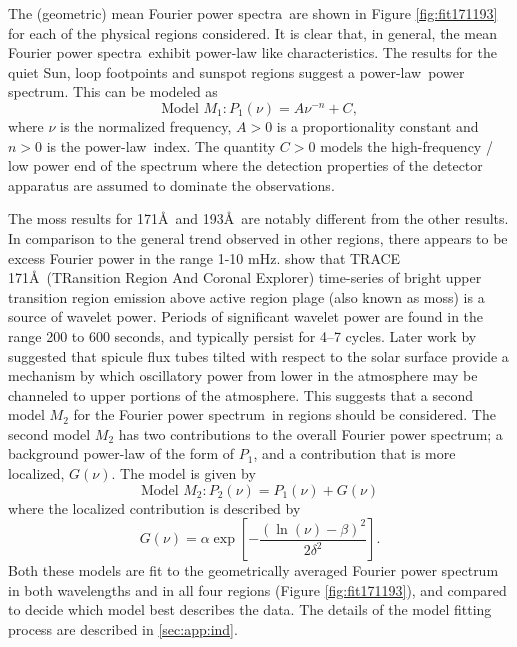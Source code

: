 \documentclass{aastex}
\newcommand{\PS}{power spectrum}
\newcommand{\PA}{power spectra}
\newcommand{\PL}{power-law}
\newcommand{\Fps}{Fourier \PS}
\newcommand{\mFpa}{mean Fourier \PA}
\begin{document}
The (geometric) \mFpa\ are shown in Figure \ref{fig:fit171193} for
each of the physical regions considered.  It is clear that, in
general, the \mFpa\ exhibit power-law like characteristics.  The
results for the quiet Sun, loop footpoints and sunspot regions suggest
a \PL\ \PS.  This can be modeled as
\begin{equation}
\label{eqn:pwrlaw}
\mbox{Model $M_{1}$}: P_{1}(\nu) = A\nu^{-n} + C,
\end{equation}
where $\nu$ is the normalized frequency, $A>0$ is a proportionality
constant and $n>0$ is the \PL\ index.  The quantity $C>0$ models
the high-frequency / low power end of the spectrum where the detection
properties of the detector apparatus are assumed to dominate the
observations.

The moss results for 171\AA\ and 193\AA\ are notably different from
the other results.  In comparison to the general trend observed in
other regions, there appears to be excess Fourier power in the range
1-10 mHz.  \cite{2003ApJ...595L..63D} show that TRACE
171\AA\ (TRansition Region And Coronal Explorer) time-series of bright
upper transition region emission above active region plage (also known
as moss) is a source of wavelet power. Periods of significant wavelet
power are found in the range 200 to 600 seconds, and typically persist
for 4–7 cycles.  Later work by \cite{2005ApJ...624L..61D} suggested
that spicule flux tubes tilted with respect to the solar surface
provide a mechanism by which oscillatory power from lower in the
atmosphere may be channeled to upper portions of the atmosphere.  This
suggests that a second model $M_{2}$ for the \Fps\ in regions should
be considered.  The second model $M_{2}$ has two contributions to the
overall \Fps; a background power-law of the form of $P_{1}$, and a
contribution that is more localized, $G(\nu)$.  The model is given by
\begin{equation}
\label{eqn:pwrlawbump}
\mbox{Model $M_{2}$}: P_{2}(\nu) = P_{1}(\nu) + G(\nu)
\end{equation}
where the localized contribution is described by
\begin{equation}
\label{eqn:bump}
G(\nu) = \alpha\exp\left[-\frac{(\ln(\nu)-\beta)^{2}}{2\delta^{2}}\right].
\end{equation}
Both these models are fit to the geometrically averaged Fourier power
spectrum in both wavelengths and in all four regions (Figure
\ref{fig:fit171193}), and compared to decide which model best
describes the data. The details of the model fitting process are
described in \ref{sec:app:ind}.
\end{document}
